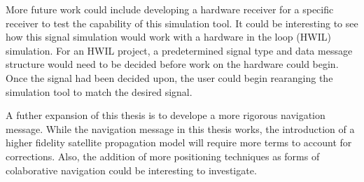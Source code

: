 \documentclass[12pt]{report}
\begin{document}
More future work could include developing a hardware receiver for a specific receiver to test the capability of this simulation tool. It could be interesting to see how this signal simulation would work with a hardware in the loop (HWIL) simulation. For an HWIL project, a predetermined signal type and data message structure would need to be decided before work on the hardware could begin. Once the signal had been decided upon, the user could begin rearanging the simulation tool to match the desired signal. 

A futher expansion of this thesis is to develope a more rigorous navigation message. While the navigation message in this thesis works, the introduction of a higher fidelity satellite propagation model will require more terms to account for corrections. Also, the addition of more positioning techniques as forms of colaborative navigation could be interesting to investigate. 




%





\end{document}
